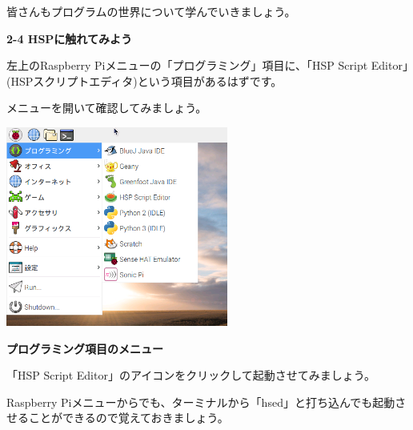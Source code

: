 \documentclass[a4paper,dvipdfmx]{jarticle}
\newcommand\textstyleqwerty[1]{#1}
\begin{document}
皆さんもプログラムの世界について学んでいきましょう。


\bigskip


\bigskip

\textstyleqwerty{\textbf{2-4 HSPに触れてみよう}}


\bigskip

左上のRaspberry
Piメニューの「プログラミング」項目に、「HSP
Script
Editor」(HSPスクリプトエディタ)という項目があるはずです。

メニューを開いて確認してみましょう。



\begin{center}
\includegraphics[width=7.31cm,height=6.562cm]{text02-img/text02-img009.png}

\end{center}

\bigskip


\bigskip


\bigskip

\textstyleqwerty{\textbf{プログラミング項目のメニュー}}


\bigskip


\bigskip


\bigskip


\bigskip


\bigskip


\bigskip


\bigskip


\bigskip


\bigskip


\bigskip


\bigskip


\bigskip

「HSP Script
Editor」のアイコンをクリックして起動させてみましょう。

Raspberry
Piメニューからでも、ターミナルから「hsed」と打ち込んでも起動させることができるので覚えておきましょう。
\end{document}
